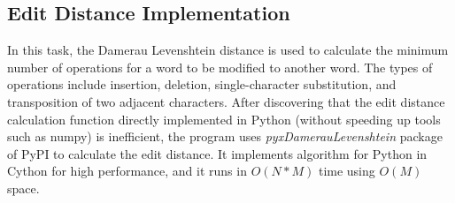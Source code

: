 \documentclass{article}
\begin{document}
    \subsection{Edit Distance Implementation}
    \label{subsec:edit-distance-implementation}

    In this task, the Damerau Levenshtein distance is used to calculate the minimum number of operations for a word to be modified to another word.
    The types of operations include insertion, deletion, single-character substitution, and transposition of two adjacent characters.
    After discovering that the edit distance calculation function directly implemented in Python (without speeding up tools such as numpy) is inefficient, the program uses \textit{pyxDamerauLevenshtein} package of PyPI to calculate the edit distance.
    It implements algorithm for Python in Cython for high performance, and it runs in $O(N*M)$ time using $O(M)$ space.




\end{document}
